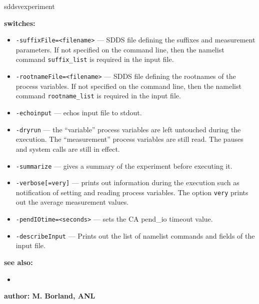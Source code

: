 \begin{sddsprog}{sddsvexperiment}
\item {\bf switches:}
   \begin{itemize}
   \item {\verb+-suffixFile=<filename>+} --- SDDS file defining the suffixes and measurement parameters. If not specified
               on the command line, then the namelist command {\verb+suffix_list+} is required in the input file.
   \item {\verb+-rootnameFile=<filename>+} --- SDDS file defining the rootnames of the process variables. If not specified
               on the command line, then the namelist command {\verb+rootname_list+} is required in the input file.
    \item {\verb+-echoinput+} --- echos input file to stdout.
    \item {\verb+-dryrun+} --- the ``variable'' process variables are left untouched during the execution. The ``measurement''
                process variables are still read. The pauses and system calls are still in effect.
    \item {\verb+-summarize+} --- gives a summary of the experiment before executing it.
    \item {\verb+-verbose[=very]+} --- prints out information during the execution such as notification of
                setting and reading process variables.  The option \verb+very+ prints out the average measurement values.
    \item {\verb+-pendIOtime=<seconds>+} --- sets the CA pend\_io timeout value.
    \item {\verb+-describeInput+} --- Prints out the list of namelist commands and fields of the input file.
   \end{itemize}

\item {\bf see also:}
    \begin{itemize}
    \item {}
    \end{itemize}
\item {\bf author: M. Borland, ANL} 
\end{sddsprog}
